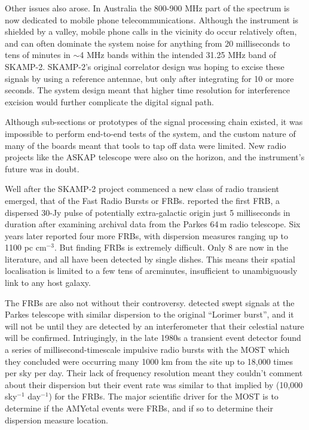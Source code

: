 Other issues also arose. In Australia the 800-900 MHz part of the spectrum is now dedicated to mobile phone telecommunications. Although the instrument is shielded by a valley, mobile phone calls in the vicinity do occur relatively often, and can often dominate the system noise for anything from 20 milliseconds to tens of minutes in $\sim$4 MHz bands within the intended 31.25 MHz band of SKAMP-2. SKAMP-2's original correlator design was hoping to excise these signals by using a reference antennae, but only after integrating for 10 or more seconds. The system design meant that higher time resolution for interference excision would further complicate the digital signal path. 

Although sub-sections or prototypes of the signal processing chain existed, it was impossible to perform end-to-end tests of the system, and the custom nature of many of the boards meant that tools to tap off data were limited.  New radio projects like the ASKAP telescope were also on the horizon, and the instrument's future was in doubt.

Well after the SKAMP-2 project commenced a new class of radio transient emerged, that of the Fast Radio Bursts or FRBs. \cite{Lorimer_2007} reported the first FRB, a dispersed 30-Jy pulse of potentially extra-galactic origin just 5 milliseconds in duration after examining archival data from the Parkes 64\,m radio telescope. Six years later \citep{Thornton_2013} reported four more FRBs, with dispersion measures ranging up to 1100 pc cm$^{-3}$. But finding FRBs is extremely difficult. Only 8 are now in the literature, and all have been detected by single dishes. This means their spatial localisation is limited to a few tens of arcminutes, insufficient to unambiguously link to any host galaxy.

The FRBs are also not without their controversy. \cite{Burke_Spolaor_2011} detected swept signals at the Parkes telescope with similar dispersion to the original ``Lorimer burst'', and it will not be until they are detected by an interferometer that their celestial nature will be confirmed. Intriugingly, in the late 1980s a transient event detector found a series of millisecond-timescale impulsive radio bursts with the MOST which they concluded were occurring many 1000 km from the site up to 18,000 times per sky per day\cite{Lovell_2008}. Their lack of frequency resolution meant they couldn't comment about their dispersion but their event rate was similar to that implied by \citep{Thornton_2013} (10,000 sky$^{-1}$ day$^{-1}$) for the FRBs. The major scientific driver for the MOST is to determine if the AMYetal events were FRBs, and if so to determine their dispersion measure location.

